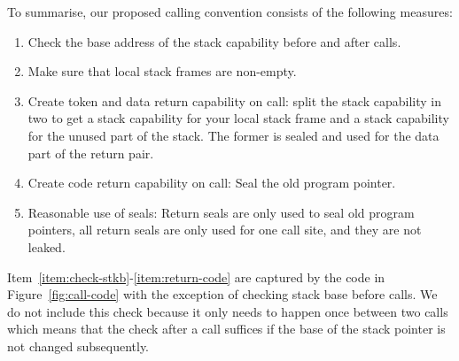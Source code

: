\documentclass[acmsmall,review,showframe]{acmart}\settopmatter{printfolios=true,printccs=false,printacmref=false}
\begin{document}
To summarise, our proposed calling convention \stktokens{} consists of the following measures:
\begin{enumerate}
\item \label{item:check-stkb} Check the base address of the stack capability before and after calls.
\item \label{item:non-empty-sf} Make sure that local stack frames are non-empty.
\item \label{item:return-data} Create token and data return capability on call: split the stack capability in two to get a stack capability for your local stack frame and a stack capability for the unused part of the stack. The former is sealed and used for the data part of the return pair.
\item \label{item:return-code} Create code return capability on call: Seal the old program pointer.
\item Reasonable use of seals: Return seals are only used to seal old program pointers, all return seals are only used for one call site, and they are not leaked.
\end{enumerate}
Item~\ref{item:check-stkb}-\ref{item:return-code} are captured by the code in Figure~\ref{fig:call-code} with the exception of checking stack base before calls. We do not include this check because it only needs to happen once between two calls which means that the check after a call suffices if the base of the stack pointer is not changed subsequently.
\end{document}

